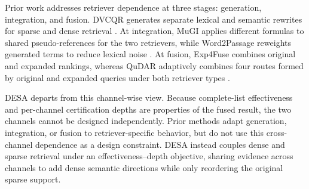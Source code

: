\label{retriever-aware-expansion-and-integration}

Prior work addresses retriever dependence at three stages: generation, integration, and fusion. DVCQR generates separate lexical and semantic rewrites for sparse and dense retrieval \citep{li-etal-2026-dvcqr}. At integration, MuGI applies different formulas to shared pseudo-references for the two retrievers, while Word2Passage reweights generated terms to reduce lexical noise \citep{zhang-etal-2024-exploring-best, choi-etal-2025-word2passage}. At fusion, Exp4Fuse combines original and expanded rankings, whereas QuDAR adaptively combines four routes formed by original and expanded queries under both retriever types \citep{liu-zhang-2025-exp4fuse, kim-etal-2026-qudar}.

DESA departs from this channel-wise view. Because complete-list effectiveness and per-channel certification depths are properties of the fused result, the two channels cannot be designed independently. Prior methods adapt generation, integration, or fusion to retriever-specific behavior, but do not use this cross-channel dependence as a design constraint. DESA instead couples dense and sparse retrieval under an effectiveness--depth objective, sharing evidence across channels to add dense semantic directions while only reordering the original sparse support.

